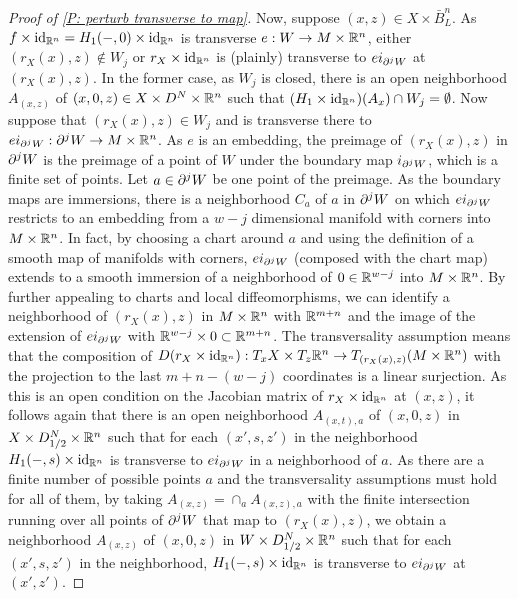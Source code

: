 \begin{proof}[Proof of \cref{P: perturb transverse to map}]
Now, suppose $(x,z)\in X\times \bar B^n_L$. As $f\times \mathrm{id}_{\mathbb{R}^n}=H_1(-,0)\times \mathrm{id}_{\mathbb{R}^n}$ is transverse $e:W\to M\times \mathbb{R}^n$, either $(r_X(x),z)\notin W_j$ or $r_X\times \mathrm{id}_{\mathbb{R}^n}$ is (plainly) transverse to $ei_{\partial^jW}$ at $(r_X(x),z)$. In the former case, as $W_j$ is closed, there is an open neighborhood $A_{(x,z)}$ of $(x,0,z)\in X\times D^N\times \mathbb{R}^n$ such that $(H_1\times \mathrm{id}_{\mathbb{R}^n})(A_x)\cap W_j=\emptyset$. Now suppose that $(r_X(x),z)\in W_j$ and is transverse there to $ei_{\partial^jW}:\partial^jW\to M\times \mathbb{R}^n$. As $e$ is an embedding, the preimage of $(r_X(x),z)$ in $\partial^jW$ is the preimage of a point of $W$ under the boundary map $i_{\partial^jW}$, which is a finite set of points. Let $a\in \partial^jW$ be one point of the preimage. As the boundary maps are immersions, there is a neighborhood $C_a$ of $a$ in $\partial^jW$ on which $ei_{\partial^jW}$ restricts to an embedding from a $w-j$ dimensional manifold with corners into $M\times \mathbb{R}^n$. In fact, by choosing a chart around $a$ and using the definition of a smooth map of manifolds with corners, $ei_{\partial^jW}$ (composed with the chart map) extends to a smooth immersion of a neighborhood of $0\in \mathbb{R}^{w-j}$ into $M\times \mathbb{R}^n$.
 By further appealing to charts and local diffeomorphisms, we can identify a neighborhood of $(r_X(x),z)$ in $M\times \mathbb{R}^n$ with $\mathbb{R}^{m+n}$ and the image of the extension of $ei_{\partial^jW}$ with $\mathbb{R}^{w-j}\times 0\subset \mathbb{R}^{m+n}$.
 The transversality assumption means that the composition of $D(r_X\times \mathrm{id}_{\mathbb{R}^n}):T_xX\times T_z\mathbb{R}^n
\to T_{(r_X(x),z)}(M\times \mathbb{R}^n)$ with the projection to the last $m+n-(w-j)$ coordinates is a linear surjection. As this is an open condition on the Jacobian matrix of $r_X\times \mathrm{id}_{\mathbb{R}^n}$ at $(x,z)$, it follows again that there is an open neighborhood $A_{(x,t),a}$ of $(x,0,z)$ in $X\times D_{1/2}^N\times \mathbb{R}^n$ such that for each $(x',s,z')$ in the neighborhood $H_1(-,s)\times \mathrm{id}_{\mathbb{R}^n}$ is transverse to $ei_{\partial^jW}$ in a neighborhood of $a$. As there are a finite number of possible points $a$ and the transversality assumptions must hold for all of them, by taking $A_{(x,z)}=\cap_a A_{(x,z),a}$ with the finite intersection running over all points of $\partial^jW$ that map to $(r_X(x),z)$, we obtain a neighborhood $A_{(x,z)}$ of $(x,0,z)$ in $W\times D_{1/2}^N\times \mathbb{R}^n$ such that for each $(x',s,z')$ in the neighborhood, $H_1(-,s)\times \mathrm{id}_{\mathbb{R}^n}$ is transverse to $ei_{\partial^jW}$ at $(x',z')$.


\end{proof}
